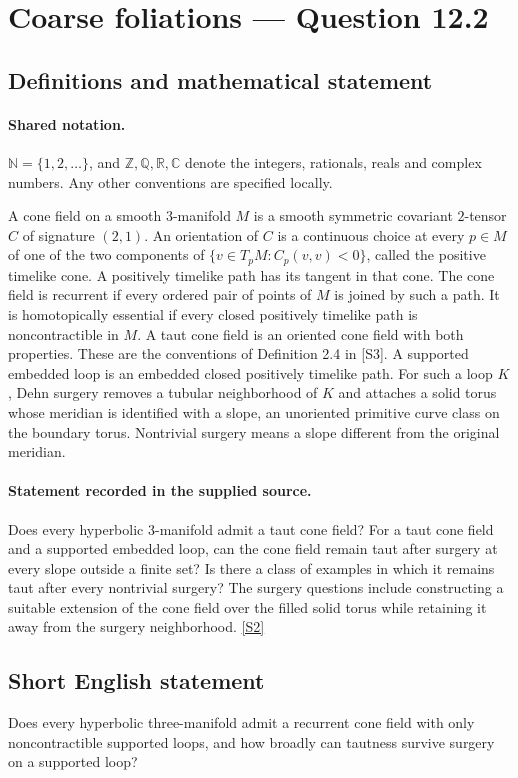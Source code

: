 \documentclass[11pt]{article}
\newcommand{\sref}[2]{\hyperlink{source:#1:#2}{[S#2]}}
\begin{document}
\section{Coarse foliations — Question 12.2}\label{statement}

\subsection{Definitions and mathematical statement}

\paragraph{Shared notation.}$\mathbb N=\{1,2,\ldots\}$, and $\mathbb Z,\mathbb Q,\mathbb R,\mathbb C$ denote the integers, rationals, reals and complex numbers. Any other conventions are specified locally.


A cone field on a smooth $3$-manifold $M$ is a smooth symmetric covariant $2$-tensor $C$ of signature $(2,1)$. An orientation of $C$ is a continuous choice at every $p\in M$ of one of the two components of $\{v\in T_pM:C_p(v,v)<0\}$, called the positive timelike cone. A positively timelike path has its tangent in that cone. The cone field is recurrent if every ordered pair of points of $M$ is joined by such a path. It is homotopically essential if every closed positively timelike path is noncontractible in $M$. A taut cone field is an oriented cone field with both properties. These are the conventions of Definition 2.4 in [S3]. A supported embedded loop is an embedded closed positively timelike path. For such a loop $K$, Dehn surgery removes a tubular neighborhood of $K$ and attaches a solid torus whose meridian is identified with a slope, an unoriented primitive curve class on the boundary torus. Nontrivial surgery means a slope different from the original meridian.
\paragraph{Statement recorded in the supplied source.}
Does every hyperbolic $3$-manifold admit a taut cone field? For a taut cone field and a supported embedded loop, can the cone field remain taut after surgery at every slope outside a finite set? Is there a class of examples in which it remains taut after every nontrivial surgery? The surgery questions include constructing a suitable extension of the cone field over the filled solid torus while retaining it away from the surgery neighborhood. \sref{statement}{2}
\subsection{Short English statement}
Does every hyperbolic three-manifold admit a recurrent cone field with only noncontractible supported loops, and how broadly can tautness survive surgery on a supported loop?
\end{document}
